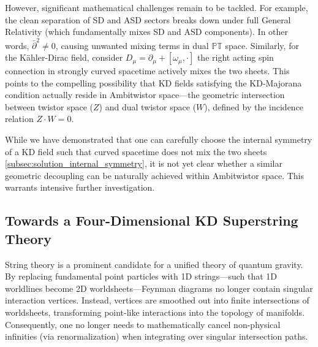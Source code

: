 However, significant mathematical challenges remain to be tackled. For example, the clean separation of SD and ASD sectors breaks down under full General Relativity (which fundamentally mixes SD and ASD components). In other words, $\bar\partial^2\neq0$, causing unwanted mixing terms in dual $\mathbb{PT}$ space. Similarly, for the Kähler-Dirac field, consider $D_\mu=\partial_\mu+[\omega_\mu,\cdot]$ the right acting spin connection in strongly curved spacetime actively mixes the two sheets. This points to the compelling possibility that KD fields satisfying the KD-Majorana condition actually reside in Ambitwistor space—the geometric intersection between twistor space ($Z$) and dual twistor space ($W$), defined by the incidence relation $Z\cdot W=0$. 

While we have demonstrated that one can carefully choose the internal symmetry of a KD field such that curved spacetime does not mix the two sheets \cref{subsec:solution_internal_symmetry}, it is not yet clear whether a similar geometric decoupling can be naturally achieved within Ambitwistor space. This warrants intensive further investigation.

\subsection{Towards a Four-Dimensional KD Superstring Theory}


String theory is a prominent candidate for a unified theory of quantum gravity. By replacing fundamental point particles with 1D strings—such that 1D worldlines become 2D worldsheets—Feynman diagrams no longer contain singular interaction vertices. Instead, vertices are smoothed out into finite intersections of worldsheets, transforming point-like interactions into the topology of manifolds. Consequently, one no longer needs to mathematically cancel non-physical infinities (via renormalization) when integrating over singular intersection paths.

